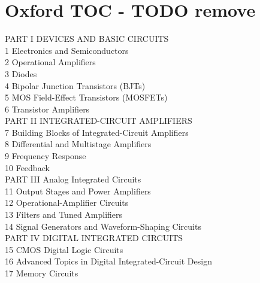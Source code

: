 \documentclass[twocolumn]{article}
\begin{document}
  \section{Oxford TOC - TODO remove}
    PART I DEVICES AND BASIC CIRCUITS \\
    1 Electronics and Semiconductors \\
    2 Operational Amplifiers \\
    3 Diodes \\
    4 Bipolar Junction Transistors (BJTs) \\
    5 MOS Field-Effect Transistors (MOSFETs) \\
    6 Transistor Amplifiers \\
    PART II INTEGRATED-CIRCUIT AMPLIFIERS \\
    7 Building Blocks of Integrated-Circuit Amplifiers \\
    8 Differential and Multistage Amplifiers \\
    9 Frequency Response \\
    10 Feedback \\
    PART III Analog Integrated Circuits \\
    11 Output Stages and Power Amplifiers \\
    12 Operational-Amplifier Circuits \\
    13 Filters and Tuned Amplifiers \\
    14 Signal Generators and Waveform-Shaping Circuits \\
    PART IV DIGITAL INTEGRATED CIRCUITS \\
    15 CMOS Digital Logic Circuits \\
    16 Advanced Topics in Digital Integrated-Circuit Design \\
    17 Memory Circuits
\end{document}
